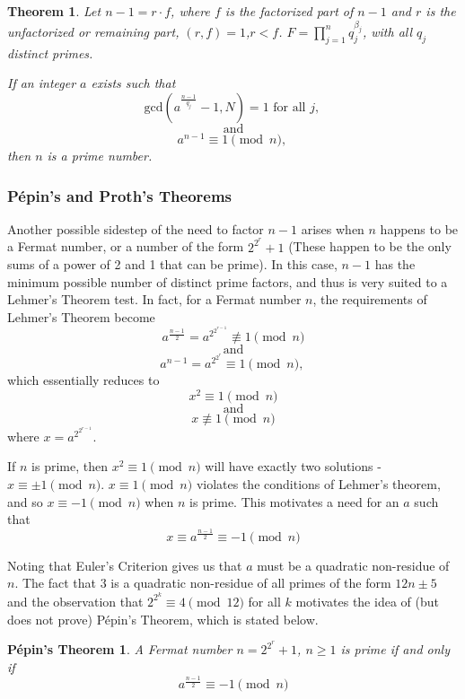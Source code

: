 \documentclass{article}
\newtheorem*{theorem}{Theorem}
\begin{document}
\begin{theorem}
Let $n - 1 = r \cdot f$, where $f$ is the factorized part of $n-1$ and $r$ is the unfactorized or remaining part, $(r,f) = 1$,$r < f$. $F = \prod^n_{j=1} q_j^{\beta_j}$, with all $q_j$ distinct primes.
\par If an integer $a$ exists such that
	$$\text{gcd}(a^{\frac{n-1}{q_j}} - 1, N) = 1 \text{ for all } j \text{, }$$
	$$\text{ and }$$
	$$a^{n-1} \equiv 1 \pmod n \text{, }$$
then $n$ is a prime number.
\end{theorem}


\subsubsection*{P\'{e}pin's and Proth's Theorems}
Another possible sidestep of the need to factor $n-1$ arises when $n$ happens to be a Fermat number, or a number of the form $2^{2^r} + 1$ (These happen to be the only sums of a power of 2 and 1 that can be prime). In this case, $n - 1$ has the minimum possible number of distinct prime factors, and thus is very suited to a Lehmer's Theorem test. In fact, for a Fermat number $n$, the requirements of Lehmer's Theorem become
	$$a^{\frac{n - 1}{2}} = a^{2^{2^{r-1}}} \not\equiv 1 \pmod n $$
	$$\text{ and } $$
	$$a^{n - 1} = a^{2^{2^{r}}} \equiv 1 \pmod n \text{, }$$
which essentially reduces to 
	$$x^2 \equiv 1 \pmod n$$
	$$\text{ and }$$
	$$x \not \equiv 1 \pmod n$$
where $x = a^{2^{2^{r-1}}}$.

If $n$ is prime, then $x^2 \equiv 1 \pmod n$ will have exactly two solutions - $x \equiv \pm 1 \pmod n$. $x \equiv 1 \pmod n$ violates the conditions of Lehmer's theorem, and so $x \equiv -1 \pmod n$ when $n$ is prime. This motivates a need for an $a$ such that 
	$$x \equiv a^{\frac{n - 1}{2}} \equiv -1 \pmod n$$
	
\par Noting that Euler's Criterion gives us that $a$ must be a quadratic non-residue of $n$. The fact that $3$ is a quadratic non-residue of all primes of the form $12n \pm 5$ and the observation that $2^{2^k} \equiv 4 \pmod 12$ for all $k$ motivates the idea of (but does not prove) P\'{e}pin's Theorem, which is stated below.

\newtheorem*{pepin}{P\'{e}pin's Theorem}
\begin{pepin}
A Fermat number $n = 2^{2^r} + 1$, $n \geq 1$ is prime if and only if 
	$$ a^{\frac{n - 1}{2}} \equiv  - 1 \pmod n$$
\end{pepin}
\end{document}
